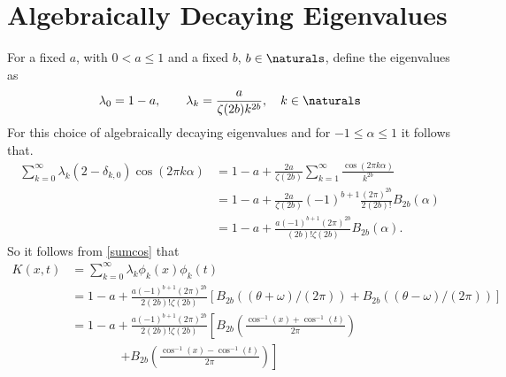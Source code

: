 \documentclass[]{elsarticle}
\theoremstyle{definition}
\begin{document}
\section{Algebraically Decaying Eigenvalues}
For a fixed $a$, with $0<a\le 1$ and a fixed $b$, $b \in \naturals$, define the eigenvalues as
\begin{equation}
\lambda_0=1-a, \qquad \lambda_k = \frac{a}{\zeta(2b)k^{2b}}, \quad k \in \naturals
\end{equation}
For this choice of algebraically decaying eigenvalues and for $-1 \le \alpha \le 1$ it follows that.
\begin{align*}
\sum_{k=0}^{\infty} \lambda_k (2-\delta_{k,0}) \cos(2 \pi k\alpha)
&= 1-a + \frac{2a}{\zeta(2b)}\sum_{k=1}^{\infty} \frac{\cos(2 \pi k\alpha)}{k^{2b}}\\
&= 1-a + \frac{2a}{\zeta(2b)} (-1)^{b+1} \frac{(2 \pi)^{2b}} {2 (2b)!} B_{2b}(\alpha) \\
&= 1-a + \frac{a (-1)^{b+1}(2 \pi)^{2b}}{(2b)!\zeta(2b)} B_{2b}(\alpha).
\end{align*}
So it follows from \eqref{sumcos} that
\begin{align*}
K(x,t) &= \sum_{k=0}^{\infty} \lambda_k \phi_k(x)\phi_k(t) \\
&= 1-a + \frac{a (-1)^{b+1}(2 \pi)^{2b}}{2(2b)!\zeta(2b)} [B_{2b}((\theta + \omega)/(2\pi)) + B_{2b}((\theta - \omega)/(2\pi))]\\
&= 1-a + \frac{a (-1)^{b+1}(2 \pi)^{2b}}{2(2b)!\zeta(2b)} \left[B_{2b}\left(\frac{\cos^{-1}(x) + \cos^{-1}(t)}{2\pi}\right) \right .  \\
& \qquad \qquad \left. + B_{2b}\left(\frac{\cos^{-1}(x) - \cos^{-1}(t)}{2\pi}\right) \right]
\end{align*}



\end{document}
